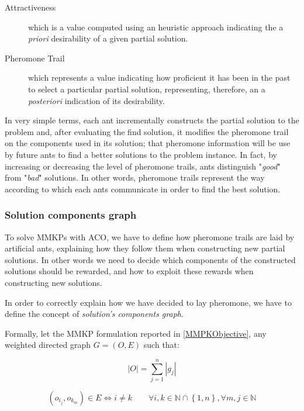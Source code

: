 \documentclass[12pt,a4paper]{report}
\newcommand{\N}{\mathbb{N}}
\begin{document}
\begin{description}
	\item[Attractiveness] which is a value computed using an heuristic approach indicating the a \textit{priori} desirability of a given partial solution.
	
	\item[Pheromone Trail] which represents a value indicating how proficient it has been in the past to select a particular partial solution, representing, therefore, an a \textit{posteriori} indication of its desirability.
\end{description} 

In very simple terms, each ant incrementally constructs the partial solution to the problem and, after evaluating the find solution, it modifies the pheromone trail on the components used in its solution; that pheromone information will be use by future ants to find a better solutions to the problem instance. In fact, by increasing or decreasing the level of pheromone trails, ants distinguish "\textit{good}" from "\textit{bad}" solutions. In other words, pheromone trails represent the way according to which each ants communicate in order to find the best solution.
 
\subsubsection{Solution components graph}

To solve MMKPs with ACO, we have to define how pheromone trails are laid by artificial ants, explaining how they follow them when constructing new partial solutions. In other words we need to decide which components of the constructed solutions should be rewarded, and how to exploit these rewards when constructing new solutions.

In order to correctly explain how we have decided to lay pheromone, we have to define the concept of \textit{solution's components graph}.

Formally, let the MMKP formulation reported in \ref{MMPKObjective}, any weighted directed graph $G=(O,E)$ such that:

\begin{equation}
	|O| = \sum_{j=1}^n |g_j|
\end{equation}

\begin{equation}
	(o_{i_j}, o_{k_m}) \in E \Leftrightarrow i \neq k \qquad \forall i,k \in \N \cap \left\{1,n\right\}, \forall m,j \in \N
\end{equation}
\end{document}
